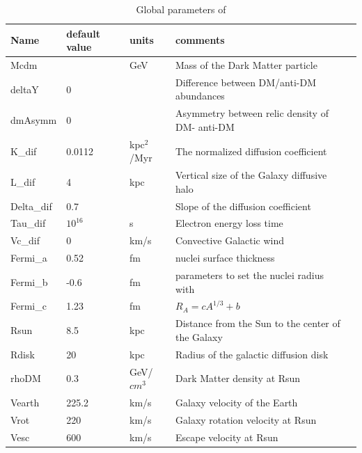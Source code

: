 \documentclass[12pt,a4paper]{article}
\begin{document}
\begin{table}[htbp]
 \caption{Global parameters of \micro}
 \label{paramTab}
\begin{center}
\begin{tabular}{|l|l|l|l|l|}
\hline
  Name      &default value & units &  comments \\  \hline
  Mcdm      &              &  GeV  & Mass of the Dark Matter particle           \\ 
  deltaY     &  0          &           & Difference between DM/anti-DM abundances\\
  dmAsymm    &  0          &           & Asymmetry between relic density of
  DM- anti-DM\\
K\_dif      & 0.0112     & kpc$^2$/Myr & The normalized diffusion coefficient\\
L\_dif      & 4           & kpc       & Vertical size of the Galaxy diffusive halo \\
Delta\_dif   & 0.7        &           &Slope of the diffusion coefficient\\ 
Tau\_dif    & $10^{16}$   &   s       &Electron energy loss time\\
Vc\_dif     & 0           &  km/s     &  Convective Galactic wind \\
Fermi\_a    &  0.52        &  fm   & nuclei  surface thickness \\
Fermi\_b    &  -0.6        &  fm   &  parameters to set the nuclei radius with  \\    
Fermi\_c    &  1.23        &  fm   &  $R_A=c A^{1/3} +b$ \\ 
Rsun        & 8.5          & kpc   & Distance from the Sun to the center of the Galaxy\\
Rdisk       & 20           & kpc   & Radius of the galactic diffusion disk \\
rhoDM       &  0.3         & GeV/$cm^3$ & Dark Matter density at Rsun\\
Vearth      &  225.2   & km/s     & Galaxy velocity of the Earth     \\
Vrot       &  220   & km/s     & Galaxy rotation velocity at Rsun     \\
Vesc     &  600   & km/s     & Escape velocity at Rsun     \\
\hline
\end{tabular}
\end{center}
\end{table}
\end{document}
